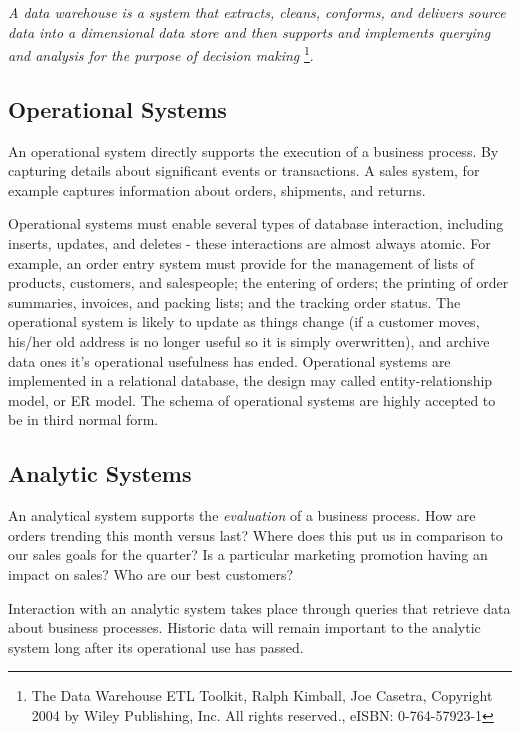 \documentclass[letterpaper,10pt,oneside]{sphinxmanual}
\begin{document}
\emph{A data warehouse is a system that extracts, cleans, conforms, and delivers source data into a dimensional data store and then supports and implements querying and analysis for the purpose of decision making} \footnote[5]{\sphinxAtStartFootnote%
The Data Warehouse ETL Toolkit, Ralph Kimball, Joe Casetra, Copyright 2004 by Wiley Publishing, Inc. All rights reserved., eISBN: 0-764-57923-1
}.


\subsection{Operational Systems}
\label{introduction:operational-systems}
An operational system directly supports the execution of a business process.
By capturing details about significant events or transactions.
A sales system, for example captures information about orders, shipments, and returns.

Operational systems must enable several types of database interaction, including inserts, updates,
and deletes - these interactions are almost always atomic.
For example, an order entry system must provide for the management of lists of products, customers,
and salespeople; the entering of orders; the printing of order summaries, invoices, and packing
lists; and the tracking order status. The operational system is likely to update as things change
(if a customer moves, his/her old address is no longer useful so it is simply overwritten),
and archive data ones it’s operational usefulness has ended.
Operational systems are implemented in a relational database, the design may called entity-relationship model,
or ER model. The schema of operational systems are highly accepted to be in third normal form.


\subsection{Analytic Systems}
\label{introduction:analytic-systems}
An analytical system supports the \emph{evaluation} of a business process.
How are orders trending this month versus last?
Where does this put us in comparison to our sales goals for the quarter?
Is a particular marketing promotion having an impact on sales? Who are our best customers?

Interaction with an analytic system takes place through queries that retrieve data
about business processes. Historic data will remain important to the analytic system long after
its operational use has passed.
\end{document}
